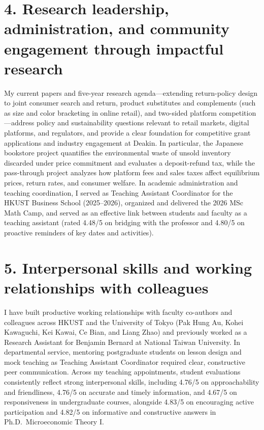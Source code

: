 \documentclass[11pt]{article}
\begin{document}
\section*{4. Research leadership, administration, and community engagement through impactful research}

My current papers and five-year research agenda---extending return-policy design to joint consumer search and return, product substitutes and complements (such as size and color bracketing in online retail), and two-sided platform competition---address policy and sustainability questions relevant to retail markets, digital platforms, and regulators, and provide a clear foundation for competitive grant applications and industry engagement at Deakin. In particular, the Japanese bookstore project quantifies the environmental waste of unsold inventory discarded under price commitment and evaluates a deposit-refund tax, while the pass-through project analyzes how platform fees and sales taxes affect equilibrium prices, return rates, and consumer welfare. In academic administration and teaching coordination, I served as Teaching Assistant Coordinator for the HKUST Business School (2025--2026), organized and delivered the 2026 MSc Math Camp, and served as an effective link between students and faculty as a teaching assistant (rated 4.48/5 on bridging with the professor and 4.80/5 on proactive reminders of key dates and activities).

\section*{5. Interpersonal skills and working relationships with colleagues}

I have built productive working relationships with faculty co-authors and colleagues across HKUST and the University of Tokyo (Pak Hung Au, Kohei Kawaguchi, Kei Kawai, Ce Bian, and Liang Zhao) and previously worked as a Research Assistant for Benjamin Bernard at National Taiwan University. In departmental service, mentoring postgraduate students on lesson design and mock teaching as Teaching Assistant Coordinator required clear, constructive peer communication. Across my teaching appointments, student evaluations consistently reflect strong interpersonal skills, including 4.76/5 on approachability and friendliness, 4.76/5 on accurate and timely information, and 4.67/5 on responsiveness in undergraduate courses, alongside 4.83/5 on encouraging active participation and 4.82/5 on informative and constructive answers in Ph.D.\ Microeconomic Theory I.
\end{document}

